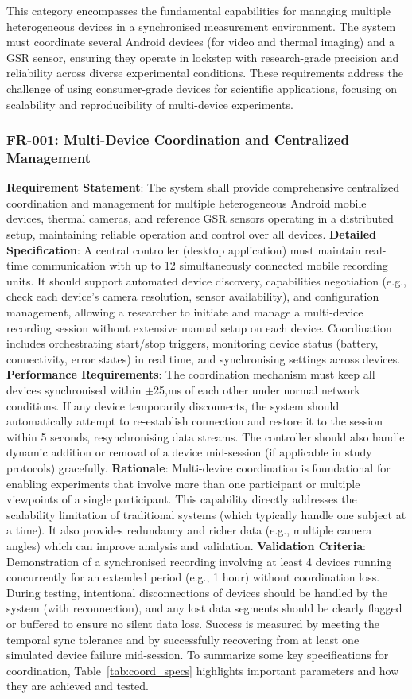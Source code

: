 \documentclass[11pt,a4paper]{report}
\begin{document}
This category encompasses the fundamental capabilities for managing multiple heterogeneous devices in a synchronised measurement environment. The system must coordinate several Android devices (for video and thermal imaging) and a GSR sensor, ensuring they operate in lockstep with research-grade precision and reliability across diverse experimental conditions. These requirements address the challenge of using consumer-grade devices for scientific applications, focusing on scalability and reproducibility of multi-device experiments. \subsubsection*{FR-001: Multi-Device Coordination and Centralized Management}
\textbf{Requirement Statement}: The system shall provide comprehensive centralized coordination and management for multiple heterogeneous Android mobile devices, thermal cameras, and reference GSR sensors operating in a distributed setup, maintaining reliable operation and control over all devices. \textbf{Detailed Specification}: A central controller (desktop application) must maintain real-time communication with up to 12 simultaneously connected mobile recording units. It should support automated device discovery, capabilities negotiation (e.g., check each device's camera resolution, sensor availability), and configuration management, allowing a researcher to initiate and manage a multi-device recording session without extensive manual setup on each device. Coordination includes orchestrating start/stop triggers, monitoring device status (battery, connectivity, error states) in real time, and synchronising settings across devices. \textbf{Performance Requirements}: The coordination mechanism must keep all devices synchronised within $\pm$25,ms of each other under normal network conditions. If any device temporarily disconnects, the system should automatically attempt to re-establish connection and restore it to the session within 5 seconds, resynchronising data streams. The controller should also handle dynamic addition or removal of a device mid-session (if applicable in study protocols) gracefully. \textbf{Rationale}: Multi-device coordination is foundational for enabling experiments that involve more than one participant or multiple viewpoints of a single participant. This capability directly addresses the scalability limitation of traditional systems (which typically handle one subject at a time). It also provides redundancy and richer data (e.g., multiple camera angles) which can improve analysis and validation. \textbf{Validation Criteria}: Demonstration of a synchronised recording involving at least 4 devices running concurrently for an extended period (e.g., 1 hour) without coordination loss. During testing, intentional disconnections of devices should be handled by the system (with reconnection), and any lost data segments should be clearly flagged or buffered to ensure no silent data loss. Success is measured by meeting the temporal sync tolerance and by successfully recovering from at least one simulated device failure mid-session. To summarize some key specifications for coordination, Table~\ref{tab:coord_specs} highlights important parameters and how they are achieved and tested. \begin{table}[h]

\end{table}
\end{document}
